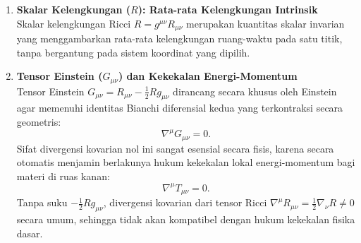\begin{enumerate}[label=(\alph*), wide=0pt, leftmargin=*]
    Berdasarkan persamaan Raychaudhuri untuk kongruensi geodesik murni tanpa pusaran (\textit{vorticity-free}), laju percepatan volume bola geodesik $V(\tau)$ pada saat awal memenuhi relasi:
    \begin{equation}
        \left. \frac{1}{V} \frac{d^2 V}{d\tau^2} \right|_{\tau=0} = - R_{\mu\nu}\, u^\mu u^\nu.
        \label{eq:raychaudhuri-ricci}
    \end{equation}
    Melalui persamaan medan bentuk Persamaan~\eqref{eq:efe-trace-reversed}, besaran ini terhubung langsung dengan materi lokal:
    \begin{equation}
        \left. \frac{1}{V} \frac{d^2 V}{d\tau^2} \right|_{\tau=0} = -\frac{8\pi G}{c^4}\left( T_{\mu\nu} - \frac{1}{2}\, T\, g_{\mu\nu} \right) u^\mu u^\nu.
        \label{eq:ricci-matter-volume}
    \end{equation}
    Artinya, jika terdapat materi atau kerapatan energi positif pada suatu titik ($T_{\mu\nu} \neq 0$), kumpulan partikel uji akan mengalami penyusutan volume ($\ddot{V} < 0$), yang secara gamblang mencerminkan sifat gravitasi yang selalu bersifat atraktif (menarik).

    \item \textbf{Skalar Kelengkungan ($R$): Rata-rata Kelengkungan Intrinsik}\\
    Skalar kelengkungan Ricci $R = g^{\mu\nu} R_{\mu\nu}$ merupakan kuantitas skalar invarian yang menggambarkan rata-rata kelengkungan ruang-waktu pada satu titik, tanpa bergantung pada sistem koordinat yang dipilih.

    \item \textbf{Tensor Einstein ($G_{\mu\nu}$) dan Kekekalan Energi-Momentum}\\
    Tensor Einstein $G_{\mu\nu} = R_{\mu\nu} - \frac{1}{2} R g_{\mu\nu}$ dirancang secara khusus oleh Einstein agar memenuhi identitas Bianchi diferensial kedua yang terkontraksi secara geometris:
    \begin{equation}
        \nabla^\mu G_{\mu\nu} = 0.
        \label{eq:bianchi-contracted}
    \end{equation}
    Sifat divergensi kovarian nol ini sangat esensial secara fisis, karena secara otomatis menjamin berlakunya hukum kekekalan lokal energi-momentum bagi materi di ruas kanan:
    \begin{equation}
        \nabla^\mu T_{\mu\nu} = 0.
        \label{eq:energy-momentum-conservation}
    \end{equation}
    Tanpa suku $-\frac{1}{2} R g_{\mu\nu}$, divergensi kovarian dari tensor Ricci $\nabla^\mu R_{\mu\nu} = \frac{1}{2}\nabla_\nu R \neq 0$ secara umum, sehingga tidak akan kompatibel dengan hukum kekekalan fisika dasar.


\end{enumerate}
